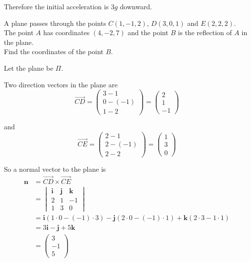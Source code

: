 \documentclass[leqno]{article}
\begin{document}
\begin{enumerate}[
  label=\textbf{\arabic*.},
  leftmargin=*,
  topsep=0pt,
  partopsep=0pt,
  parsep=0pt
]
\begin{djsSolution}
\begin{enumerate}[label=\textbf{(\alph*)}, start=1]
Therefore the initial acceleration is $3g$ downward.
\end{enumerate}
\end{djsSolution}

\newpage

\questionitem

A plane passes through the points $C(1,-1,2)$, $D(3,0,1)$ and $E(2,2,2)$. \\

The point $A$ has coordinates $(4,-2,7)$ and the point $B$ is the reflection of $A$ in the plane. \\

Find the coordinates of the point $B$. 

\vspace*{10pt}

\begin{djsSolution}
Let the plane be \(\Pi\).

Two direction vectors in the plane are
\[
\overrightarrow{CD}=\begin{pmatrix}3-1\\0-(-1)\\1-2\end{pmatrix}=\begin{pmatrix}2\\1\\-1\end{pmatrix}
\]

and
\[
\overrightarrow{CE}=\begin{pmatrix}2-1\\2-(-1)\\2-2\end{pmatrix}=\begin{pmatrix}1\\3\\0\end{pmatrix}
\]

So a normal vector to the plane is
\begin{align*}
\mathbf n
&=\overrightarrow{CD}\times\overrightarrow{CE}\\
&=
\begin{vmatrix}
\mathbf i & \mathbf j & \mathbf k\\
2 & 1 & -1\\
1 & 3 & 0
\end{vmatrix}\\
&=\mathbf i(1\cdot 0-(-1)\cdot 3)-\mathbf j(2\cdot 0-(-1)\cdot 1)+\mathbf k(2\cdot 3-1\cdot 1)\\
&=3\mathbf i-\mathbf j+5\mathbf k\\
&=\begin{pmatrix}3\\-1\\5\end{pmatrix}
\end{align*}


\end{djsSolution}
\end{enumerate}
\end{document}
